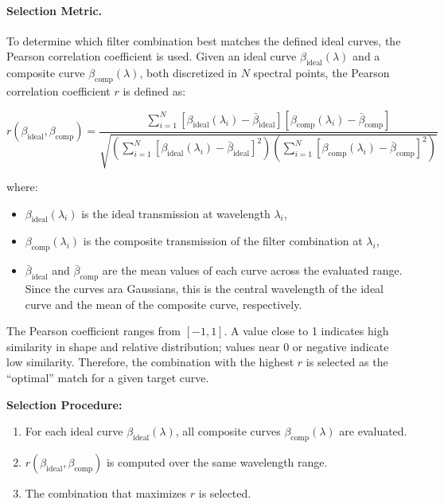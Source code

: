 \paragraph{Selection Metric.}
To determine which filter combination best matches the defined ideal curves, the Pearson correlation coefficient is used. Given an ideal curve \(\beta_{\text{ideal}}(\lambda)\) and a composite curve \(\beta_{\text{comp}}(\lambda)\), both discretized in \(N\) spectral points, the Pearson correlation coefficient \(r\) is defined as:

\begin{equation}
r(\beta_{\text{ideal}}, \beta_{\text{comp}}) =
\frac{
    \displaystyle \sum_{i=1}^{N} 
    \left[\beta_{\text{ideal}}(\lambda_i) - \bar{\beta}_{\text{ideal}}\right]
    \left[\beta_{\text{comp}}(\lambda_i) - \bar{\beta}_{\text{comp}}\right]
}{
    \sqrt{
        \left(
        \displaystyle \sum_{i=1}^{N} 
        \left[\beta_{\text{ideal}}(\lambda_i) - \bar{\beta}_{\text{ideal}}\right]^2
        \right)
        \left(
        \displaystyle \sum_{i=1}^{N} 
        \left[\beta_{\text{comp}}(\lambda_i) - \bar{\beta}_{\text{comp}}\right]^2
        \right)
    }
}
\end{equation}

where:
\begin{itemize}
    \item \(\beta_{\text{ideal}}(\lambda_i)\) is the ideal transmission at wavelength \(\lambda_i\),
    \item \(\beta_{\text{comp}}(\lambda_i)\) is the composite transmission of the filter combination at \(\lambda_i\),
    \item \(\bar{\beta}_{\text{ideal}}\) and \(\bar{\beta}_{\text{comp}}\) are the mean values of each curve across the evaluated range. Since the curves ara Gaussians, this is the central wavelength of the ideal curve and the mean of the composite curve, respectively.
\end{itemize}

\noindent The Pearson coefficient ranges from \([-1, 1]\). A value close to 1 indicates high similarity in shape and relative distribution; values near 0 or negative indicate low similarity. Therefore, the combination with the highest \(r\) is selected as the “optimal” match for a given target curve.\\

\medskip

\noindent
\textbf{Selection Procedure:}
\begin{enumerate}
    \item For each ideal curve \(\beta_{\text{ideal}}(\lambda)\), all composite curves \(\beta_{\text{comp}}(\lambda)\) are evaluated.
    \item \(r(\beta_{\text{ideal}}, \beta_{\text{comp}})\) is computed over the same wavelength range.
    \item The combination that maximizes \(r\) is selected.
\end{enumerate}

